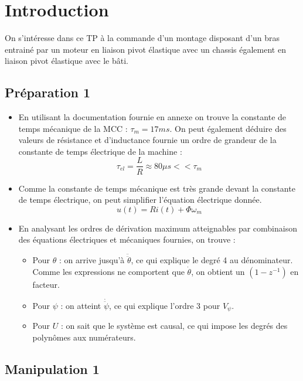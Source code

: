 \documentclass[../../Cours_M1.tex]{subfiles}
\newcommand{\z}{z^{-1}}
\begin{document}

\section{Introduction}

On s'intéresse dans ce TP à la commande d'un montage disposant d'un bras entrainé par un moteur en liaison pivot élastique avec un chassis également en liaison pivot élastique avec le bâti.

\subsection*{Préparation 1}

\begin{itemize}
\item En utilisant la documentation fournie en annexe on trouve la constante de temps mécanique de la MCC  : $\tau_m = 17 ms$. On peut également déduire des valeurs de résistance et d'inductance fournie un ordre de grandeur de la constante de temps électrique de la machine : \[\tau_{el} = \frac{L}{R} \approx 80 \mu s << \tau_m\]

\item Comme la constante de temps mécanique est très grande devant la constante de temps électrique, on peut simplifier l'équation électrique donnée. \[u(t) = Ri(t) + \Phi\omega_m\]

\item En analysant les ordres de dérivation maximum atteignables par combinaison des équations électriques et mécaniques fournies, on trouve : \begin{itemize}
\item Pour $\theta$ : on arrive jusqu'à $\ddot{\ddot{\theta}}$, ce qui explique le degré 4 au dénominateur. Comme les expressions ne comportent que $\dot{\theta}$, on obtient un $(1-\z)$ en facteur.
\item Pour $\psi$ : on atteint $\dot{\ddot{\psi}}$, ce qui explique l'ordre 3 pour $V_\psi$.
\item Pour $U$ : on sait que le système est causal, ce qui impose les degrés des polynômes aux numérateurs.
\end{itemize}

\end{itemize}

\subsection*{Manipulation 1}
\end{document}
